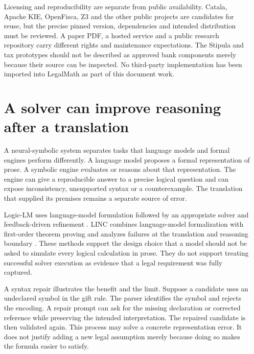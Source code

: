\documentclass[12pt,a4paper,oneside,openany]{book}
\begin{document}
Licensing and reproducibility are separate from public availability. Catala,
Apache KIE, OpenFisca, Z3 and the other public projects are candidates for reuse,
but the precise pinned version, dependencies and intended distribution must be
reviewed. A paper PDF, a hosted service and a public research repository carry
different rights and maintenance expectations. The Stipula and tax prototypes
should not be described as approved bank components merely because their source
can be inspected. No third-party implementation has been imported into LegalMath
as part of this document work.

\section{A solver can improve reasoning after a translation}
\label{merge:M04:10}

\label{sec:languages-neurosymbolic}
A neural-symbolic system separates tasks that language models and formal
engines perform differently. A language model proposes a formal representation
of prose. A symbolic engine evaluates or reasons about that representation.
The engine can give a reproducible answer to a precise logical question and
can expose inconsistency, unsupported syntax or a counterexample. The
translation that supplied its premises remains a separate source of error.

Logic-LM uses language-model formulation followed by an appropriate solver and
feedback-driven refinement \citep[sec.~3 and prompt appendices]{logiclm2023}.
LINC combines language-model formalization with first-order theorem proving
and analyzes failures at the translation and reasoning boundary
\citep[method and error analysis]{linc2023}. These methods support the design
choice that a model should not be asked to simulate every logical calculation
in prose. They do not support treating successful solver execution as evidence
that a legal requirement was fully captured.

A syntax repair illustrates the benefit and the limit. Suppose a candidate
uses an undeclared symbol in the gift rule. The parser identifies the symbol
and rejects the encoding. A repair prompt can ask for the missing declaration
or corrected reference while preserving the intended interpretation. The
repaired candidate is then validated again. This process may solve a concrete
representation error. It does not justify adding a new legal assumption
merely because doing so makes the formula easier to satisfy.
\end{document}

